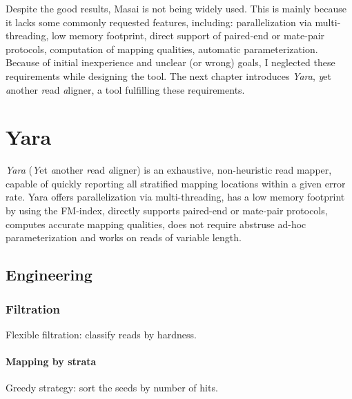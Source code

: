 Despite the good results, Masai is not being widely used.
This is mainly because it lacks some commonly requested features, including:
parallelization via multi-threading, low memory footprint, direct support of paired-end or mate-pair protocols, computation of mapping qualities, automatic parameterization.
Because of initial inexperience and unclear (or wrong) goals, I neglected these requirements while designing the tool.
The next chapter introduces \emph{Yara}, \emph{y}et \emph{a}nother \emph{r}ead \emph{a}ligner, a tool fulfilling these requirements.



\chapter{Yara}


\emph{Yara} (\emph{Y}et \emph{a}nother \emph{r}ead \emph{a}ligner) is an exhaustive, non-heuristic read mapper, capable of quickly reporting all stratified mapping locations within a given error rate.
Yara offers parallelization via multi-threading, has a low memory footprint by using the FM-index, directly supports paired-end or mate-pair protocols, computes accurate mapping qualities, does not require abstruse ad-hoc parameterization and works on reads of variable length.


\section{Engineering}

\subsection{Filtration}

Flexible filtration: classify reads by hardness.

\subsubsection{Mapping by strata}

Greedy strategy: sort the seeds by number of hits.

